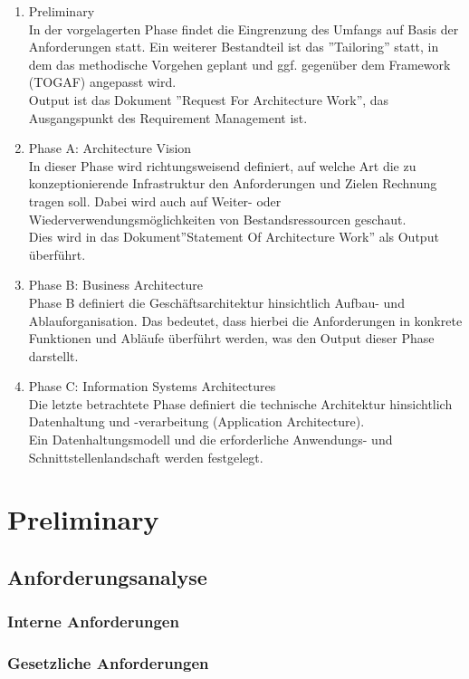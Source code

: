\begin{enumerate}
\item{Preliminary}
\\ In der vorgelagerten Phase findet die Eingrenzung des Umfangs auf Basis der Anforderungen statt. 
Ein weiterer Bestandteil ist das ''Tailoring'' statt, in dem das methodische Vorgehen geplant und ggf. gegenüber dem Framework (TOGAF) angepasst wird.\\
Output ist das Dokument ''Request For Architecture Work'', das Ausgangspunkt des Requirement Management ist.
\item{Phase A: Architecture Vision}
\\ In dieser Phase wird richtungsweisend definiert, auf welche Art die zu konzeptionierende Infrastruktur den Anforderungen und Zielen Rechnung tragen soll. Dabei wird auch auf Weiter- oder Wiederverwendungsmöglichkeiten von Bestandsressourcen geschaut.\\
Dies wird in das Dokument''Statement Of Architecture Work'' als Output überführt.
\item{Phase B: Business Architecture}
\\ Phase B definiert die Geschäftsarchitektur hinsichtlich Aufbau- und Ablauforganisation. Das bedeutet, dass hierbei die Anforderungen in konkrete Funktionen und Abläufe überführt werden, was den Output dieser Phase darstellt.
\item{Phase C: Information Systems Architectures}
\\ Die letzte betrachtete Phase definiert die technische Architektur hinsichtlich Datenhaltung und -verarbeitung (Application Architecture). \\
Ein Datenhaltungsmodell und die erforderliche Anwendungs- und Schnittstellenlandschaft werden festgelegt.


\end{enumerate}




\section{Preliminary}
\subsection{Anforderungsanalyse}
\subsubsection{Interne Anforderungen}
\subsubsection{Gesetzliche Anforderungen}

